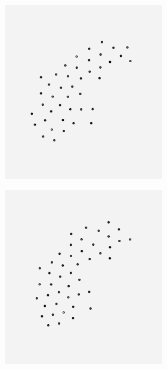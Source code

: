 \begin{figure}[H]
\begin{subfigure}[b]{1\linewidth}
\begin{subfigure}[b]{0.29\linewidth}
  	\caption{} 
  	\label{fig:ls_10_sweden2} 
  	\vspace{4ex}
  \end{subfigure}%
  \begin{subfigure}[b]{0.29\linewidth}
  	\centering
  	\includegraphics[width=0.9\linewidth]{Pictures/bp10_2_sweden} 
  	\caption{} 
  	\label{fig:bp10_2_sweden} 
  	\vspace{4ex}
  \end{subfigure}
  \begin{subfigure}[b]{0.29\linewidth}
  	\centering
  	\includegraphics[width=0.9\linewidth]{Pictures/bp5_2_sweden} 

\end{subfigure}
\end{subfigure}
\end{figure}
